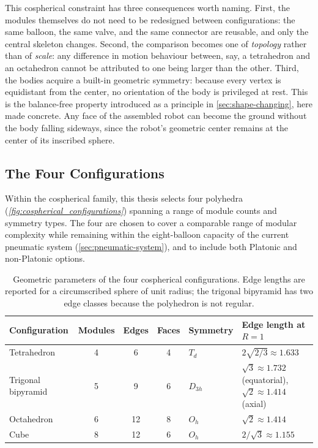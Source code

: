 This cospherical constraint has three consequences worth naming. First, the modules themselves do not need to be redesigned between configurations: the same balloon, the same valve, and the same connector are reusable, and only the central skeleton changes. Second, the comparison becomes one of \textit{topology} rather than of \textit{scale}: any difference in motion behaviour between, say, a tetrahedron and an octahedron cannot be attributed to one being larger than the other. Third, the bodies acquire a built-in geometric symmetry: because every vertex is equidistant from the center, no orientation of the body is privileged at rest. This is the balance-free property introduced as a principle in \cref{sec:shape-changing}, here made concrete. Any face of the assembled robot can become the ground without the body falling sideways, since the robot's geometric center remains at the center of its inscribed sphere.

\subsection{The Four Configurations}
\label{subsec:four-configurations}

Within the cospherical family, this thesis selects four polyhedra (\textit{\cref{fig:cospherical_configurations}}) spanning a range of module counts and symmetry types. The four are chosen to cover a comparable range of modular complexity while remaining within the eight-balloon capacity of the current pneumatic system (\cref{sec:pneumatic-system}), and to include both Platonic and non-Platonic options.

\begin{table}[h]
\centering
\footnotesize
\caption{Geometric parameters of the four cospherical configurations. Edge lengths are reported for a circumscribed sphere of unit radius; the trigonal bipyramid has two edge classes because the polyhedron is not regular.}
\label{tab:cospherical-params}
\begin{tabular}{@{}l c c c l l@{}}
\toprule
\textbf{Configuration} & \textbf{Modules} & \textbf{Edges} & \textbf{Faces} & \textbf{Symmetry} & \textbf{Edge length at \(R=1\)} \\
\midrule
Tetrahedron        & 4 & 6  & 4 & \(T_d\)    & \(2\sqrt{2/3} \approx 1.633\) \\
Trigonal bipyramid & 5 & 9  & 6 & \(D_{3h}\) & \(\sqrt{3} \approx 1.732\) (equatorial), \(\sqrt{2} \approx 1.414\) (axial) \\
Octahedron         & 6 & 12 & 8 & \(O_h\)    & \(\sqrt{2} \approx 1.414\) \\
Cube               & 8 & 12 & 6 & \(O_h\)    & \(2/\sqrt{3} \approx 1.155\) \\
\bottomrule
\end{tabular}
\end{table}

